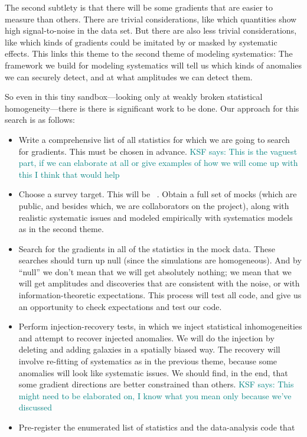 \documentclass[12pt, fullpage, letterpaper]{article}
\newcommand{\KSF}[1]{\textcolor{teal}{KSF says: #1}}
\begin{document}
The second subtlety is that there will be some gradients that are easier
to measure than others. There are trivial considerations, like which
quantities show high signal-to-noise in the data set. But there are also less
trivial considerations, like which kinds of gradients could be imitated by or
masked by systematic effects.
This links this theme to the second theme of modeling systematics:
The framework we build for modeling systematics will tell us which
kinds of anomalies we can securely detect, and at what amplitudes we
can detect them.

So even in this tiny sandbox---looking only at weakly broken
statistical homogeneity---there is there is significant work to be done.
Our approach for this search is as follows:
\begin{itemize}
\item
Write a comprehensive list of all statistics for which we are going to search
for gradients. This must be chosen in advance.
\KSF{This is the vaguest part, if we can elaborate at all or give examples of how we will come up with this I think that would help}
\item
Choose a survey target. This will be
\SDSSIV\ \eBOSS. Obtain a full set of mocks (which are public, and besides which, we are collaborators on the project), along
with realistic systematic issues and modeled empirically with
systematics models as in the second theme.
\item
Search for the gradients in all of the statistics in the mock
data. These searches should turn up null (since the simulations are
homogeneous). And by ``null'' we don't mean that we will get absolutely nothing; we mean
that we will get amplitudes and discoveries that are consistent with the noise, or with
information-theoretic expectations.
This process will test all code, and give us an
opportunity to check expectations and test our code.
\item
Perform injection-recovery tests, in which we inject statistical inhomogeneities
and attempt to recover injected anomalies.
We will do the injection by deleting and adding galaxies in a
spatially biased way.
The recovery will involve re-fitting of systematics as in the previous
theme, because some anomalies will look like systematic issues.
We should find, in the end, that some gradient directions are better constrained than others.
\KSF{This might need to be elaborated on, I know what you mean only because we've discussed}
\item
Pre-register the enumerated list of statistics and the data-analysis code that

\end{itemize}
\end{document}
